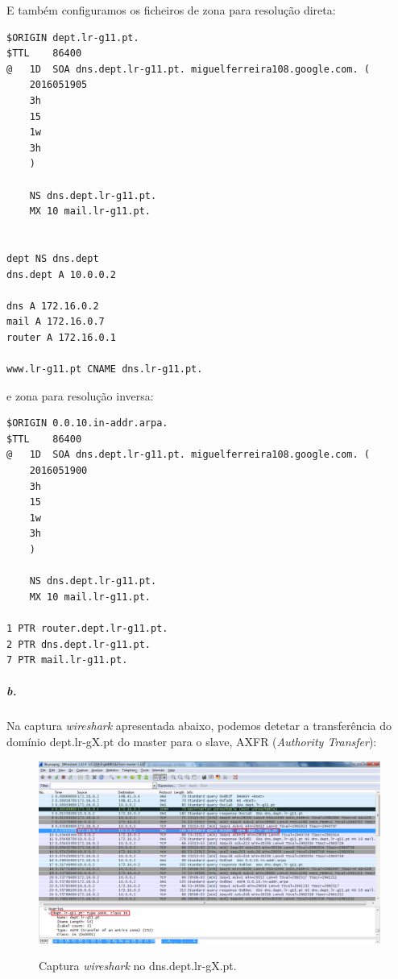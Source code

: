 E também configuramos os ficheiros de zona para resolução direta:

\begin{verbatim}
$ORIGIN	dept.lr-g11.pt.
$TTL	86400
@	1D	SOA dns.dept.lr-g11.pt.	miguelferreira108.google.com. (
	2016051905
	3h
	15
	1w
	3h
	)

	NS dns.dept.lr-g11.pt.
	MX 10 mail.lr-g11.pt.


dept NS dns.dept
dns.dept A 10.0.0.2

dns A 172.16.0.2
mail A 172.16.0.7
router A 172.16.0.1

www.lr-g11.pt CNAME dns.lr-g11.pt.
\end{verbatim}

e zona para resolução inversa:

\begin{verbatim}
$ORIGIN	0.0.10.in-addr.arpa.
$TTL	86400
@	1D	SOA dns.dept.lr-g11.pt.	miguelferreira108.google.com. (
	2016051900
	3h
	15
	1w
	3h
	)

	NS dns.dept.lr-g11.pt.
	MX 10 mail.lr-g11.pt.

1 PTR router.dept.lr-g11.pt.
2 PTR dns.dept.lr-g11.pt.
7 PTR mail.lr-g11.pt.
\end{verbatim}

\newpage
\subparagraph{b.}
Na captura \emph{wireshark} apresentada abaixo, podemos detetar a transferência do domínio \textsf{dept.lr-gX.pt} do \textsf{master} para o \textsf{slave}, \textsf{AXFR} (\emph{Authority Transfer}):

\begin{figure}[h]
\centering
\includegraphics[width=1\textwidth, height=0.38\textheight]{6b_cap.png}
\label{fig:2-capturaWireshark}
\caption{Captura \emph{wireshark} no \textsf{dns.dept.lr-gX.pt}.}
\end{figure}


